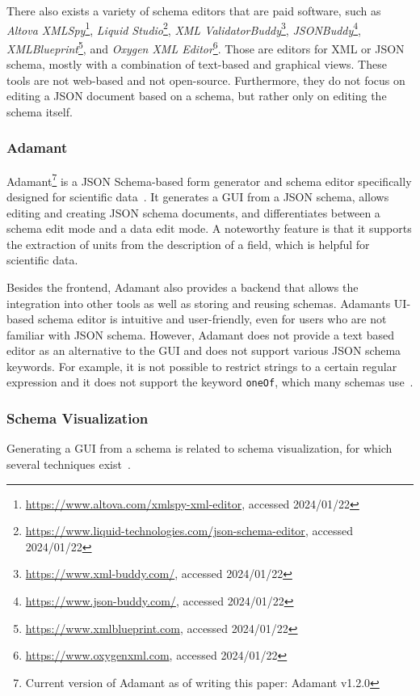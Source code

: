 There also exists a variety of schema editors that are paid software, such as \textit{Altova XMLSpy}\footnote{\url{https://www.altova.com/xmlspy-xml-editor}, accessed 2024/01/22},
\textit{Liquid Studio}\footnote{\url{https://www.liquid-technologies.com/json-schema-editor}, accessed 2024/01/22}, \textit{XML ValidatorBuddy}\footnote{\url{https://www.xml-buddy.com/}, accessed 2024/01/22},
\textit{JSONBuddy}\footnote{\url{https://www.json-buddy.com/}, accessed 2024/01/22}, \textit{XMLBlueprint}\footnote{\url{https://www.xmlblueprint.com}, accessed 2024/01/22},
and \textit{Oxygen XML Editor}\footnote{\url{https://www.oxygenxml.com}, accessed 2024/01/22}.
Those are editors for XML or JSON schema, mostly with a combination of text-based and graphical views.
These tools are not web-based and not open-source.
Furthermore, they do not focus on editing a JSON document based on a schema,
but rather only on editing the schema itself.


\subsubsection{Adamant}
Adamant\footnote{Current version of Adamant as of writing this paper: Adamant v1.2.0} is a JSON Schema-based form generator and schema editor specifically designed for scientific data~\cite{siffa2022adamant}.
It generates a GUI from a JSON schema, allows editing and creating JSON schema documents, and differentiates between a schema edit mode and a data edit mode.
A noteworthy feature is that it supports the extraction of units from the description of a field, which is helpful for scientific data.

Besides the frontend, Adamant also provides a backend that allows the integration into other tools as well as storing and reusing schemas.
Adamants UI-based schema editor is intuitive and user-friendly, even for users who are not familiar with JSON schema.
However, Adamant does not provide a text based editor as an alternative to the GUI and does not support various JSON schema keywords.
For example, it is not possible to restrict strings to a certain regular expression and it does not support the keyword \texttt{oneOf}, which many schemas use~\cite{baazizi2021empirical}.


\subsubsection{Schema Visualization}\label{subsubsec:schema-visualization}
Generating a GUI from a schema is related to schema visualization, for which several techniques exist~\cite{frasincar2006adapting, silva2019visualization, deligiannidis2007rdf, north2002visualization}.

